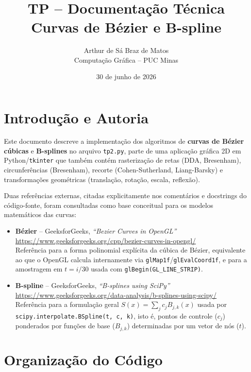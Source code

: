 \documentclass[11pt,a4paper]{article}
\title{\textbf{TP -- Documentação Técnica}\\
\large Curvas de Bézier e B-spline}
\author{Arthur de Sá Braz de Matos \\ Computação Gráfica -- PUC Minas}
\date{30 de junho de 2026}
\begin{document}
\maketitle

\section{Introdução e Autoria}

Este documento descreve a implementação dos algoritmos de \textbf{curvas de
Bézier cúbicas} e \textbf{B-splines} no arquivo \texttt{tp2.py}, parte de uma
aplicação gráfica 2D em Python/\texttt{tkinter} que também contém rasterização
de retas (DDA, Bresenham), circunferências (Bresenham), recorte (Cohen-Sutherland,
Liang-Barsky) e transformações geométricas (translação, rotação, escala, reflexão).

Duas referências externas, citadas explicitamente nos comentários e
docstrings do código-fonte, foram consultadas como base conceitual para os
modelos matemáticos das curvas:

\begin{itemize}
    \item \textbf{Bézier} -- GeeksforGeeks, \emph{“Bezier Curves in OpenGL”}\\
    \url{https://www.geeksforgeeks.org/cpp/bezier-curves-in-opengl/}\\
    Referência para a forma polinomial explícita da cúbica de Bézier, equivalente
    ao que o OpenGL calcula internamente via \texttt{glMap1f}/\texttt{glEvalCoord1f},
    e para a amostragem em $t = i/30$ usada com \texttt{glBegin(GL\_LINE\_STRIP)}.

    \item \textbf{B-spline} -- GeeksforGeeks, \emph{“B-splines using SciPy”}\\
    \url{https://www.geeksforgeeks.org/data-analysis/b-splines-using-scipy/}\\
    Referência para a formulação geral $S(x) = \sum_j c_j B_{j,k}(x)$ usada por
    \texttt{scipy.interpolate.BSpline(t, c, k)}, isto é, pontos de controle
    ($c_j$) ponderados por funções de base ($B_{j,k}$) determinadas por um vetor
    de nós ($t$).
\end{itemize}

\section{Organização do Código}
\end{document}
